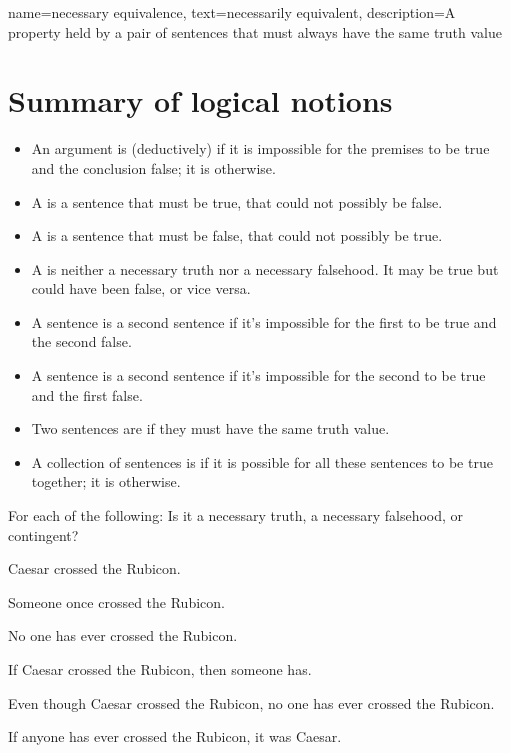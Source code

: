 {
name={necessary equivalence},
text={necessarily equivalent},
description={A property held by a pair of sentences that must always have the same truth value}
}



\section*{Summary of logical notions}

\begin{itemize}
\item An argument is (deductively)  if it is impossible for the premises to be true and the conclusion false; it is  otherwise.

\item A  is a sentence that must be true, that could not possibly be false.

\item A  is a sentence that must be false, that could not possibly be true.

\item A  is neither a necessary truth nor a necessary falsehood. It may be true but could have been false, or vice versa.

\item A sentence is  a second sentence if it's impossible for the first to be true and the second false. 

\item A sentence is  a second sentence if it's impossible for the second to be true and the first false. 

\item Two sentences are  if they must have the same truth value.

\item A collection of sentences is  if it is possible for all these sentences to be true together; it is  otherwise.
\end{itemize}


\practiceproblems
\problempart
\label{pr.EnglishTautology2}
For each of the following: Is it a necessary truth, a necessary falsehood, or contingent?
\begin{earg}
\item Caesar crossed the Rubicon.
\item Someone once crossed the Rubicon.
\item No one has ever crossed the Rubicon.
\item If Caesar crossed the Rubicon, then someone has.
\item Even though Caesar crossed the Rubicon, no one has ever crossed the Rubicon.
\item If anyone has ever crossed the Rubicon, it was Caesar.
\end{earg}

